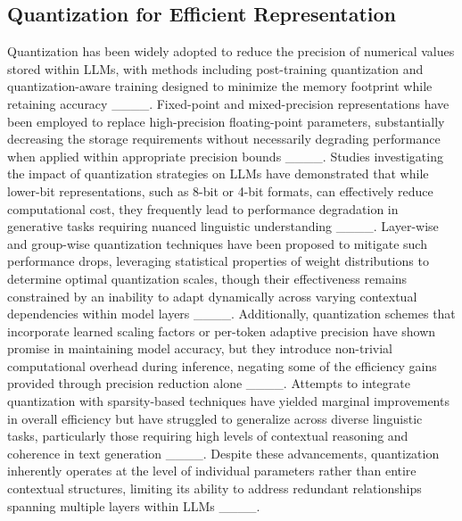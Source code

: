\subsection{Quantization for Efficient Representation}
Quantization has been widely adopted to reduce the precision of numerical values stored within LLMs, with methods including post-training quantization and quantization-aware training designed to minimize the memory footprint while retaining accuracy ____. Fixed-point and mixed-precision representations have been employed to replace high-precision floating-point parameters, substantially decreasing the storage requirements without necessarily degrading performance when applied within appropriate precision bounds ____. Studies investigating the impact of quantization strategies on LLMs have demonstrated that while lower-bit representations, such as 8-bit or 4-bit formats, can effectively reduce computational cost, they frequently lead to performance degradation in generative tasks requiring nuanced linguistic understanding ____. Layer-wise and group-wise quantization techniques have been proposed to mitigate such performance drops, leveraging statistical properties of weight distributions to determine optimal quantization scales, though their effectiveness remains constrained by an inability to adapt dynamically across varying contextual dependencies within model layers ____. Additionally, quantization schemes that incorporate learned scaling factors or per-token adaptive precision have shown promise in maintaining model accuracy, but they introduce non-trivial computational overhead during inference, negating some of the efficiency gains provided through precision reduction alone ____. Attempts to integrate quantization with sparsity-based techniques have yielded marginal improvements in overall efficiency but have struggled to generalize across diverse linguistic tasks, particularly those requiring high levels of contextual reasoning and coherence in text generation ____. Despite these advancements, quantization inherently operates at the level of individual parameters rather than entire contextual structures, limiting its ability to address redundant relationships spanning multiple layers within LLMs ____. 

